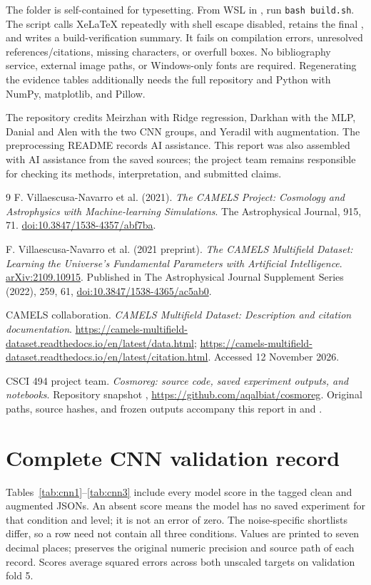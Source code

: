 \documentclass[11pt,a4paper]{article}
\begin{document}
The folder is self-contained for typesetting. From WSL in , run \texttt{bash build.sh}. The script calls XeLaTeX repeatedly with shell escape disabled, retains the final , and writes a build-verification summary. It fails on compilation errors, unresolved references/citations, missing characters, or overfull boxes. No bibliography service, external image paths, or Windows-only fonts are required. Regenerating the evidence tables additionally needs the full repository and Python with NumPy, matplotlib, and Pillow.

The repository credits Meirzhan with Ridge regression, Darkhan with the MLP, Danial and Alen with the two CNN groups, and Yeradil with augmentation. The preprocessing README records AI assistance. This report was also assembled with AI assistance from the saved sources; the project team remains responsible for checking its methods, interpretation, and submitted claims.

\begin{thebibliography}{9}
 F. Villaescusa-Navarro et al. (2021).
\emph{The CAMELS Project: Cosmology and Astrophysics with Machine-learning Simulations}.
The Astrophysical Journal, 915, 71.
\href{https://doi.org/10.3847/1538-4357/abf7ba}{doi:10.3847/1538-4357/abf7ba}.

 F. Villaescusa-Navarro et al. (2021 preprint).
\emph{The CAMELS Multifield Dataset: Learning the Universe's Fundamental Parameters with Artificial Intelligence}.
\href{https://arxiv.org/abs/2109.10915}{arXiv:2109.10915}.
Published in The Astrophysical Journal Supplement Series (2022), 259, 61,
\href{https://doi.org/10.3847/1538-4365/ac5ab0}{doi:10.3847/1538-4365/ac5ab0}.

 CAMELS collaboration.
\emph{CAMELS Multifield Dataset: Description and citation documentation}.
\url{https://camels-multifield-dataset.readthedocs.io/en/latest/data.html};
\url{https://camels-multifield-dataset.readthedocs.io/en/latest/citation.html}.
Accessed 12 November 2026.

 CSCI 494 project team.
\emph{Cosmoreg: source code, saved experiment outputs, and notebooks}.
Repository snapshot \texttt{\sourcecommit},
\url{https://github.com/aqalbiat/cosmoreg}.
Original paths, source hashes, and frozen outputs accompany this report in
 and .
\end{thebibliography}

\clearpage
\appendix
\section{Complete CNN validation record}
\label{app:cnn}
Tables~\ref{tab:cnn1}--\ref{tab:cnn3} include every model score in the tagged clean and augmented JSONs. An absent score means the model has no saved experiment for that condition and level; it is not an error of zero. The noise-specific shortlists differ, so a row need not contain all three conditions. Values are printed to seven decimal places;  preserves the original numeric precision and source path of each record. Scores average squared errors across both unscaled targets on validation fold 5.
\end{document}
